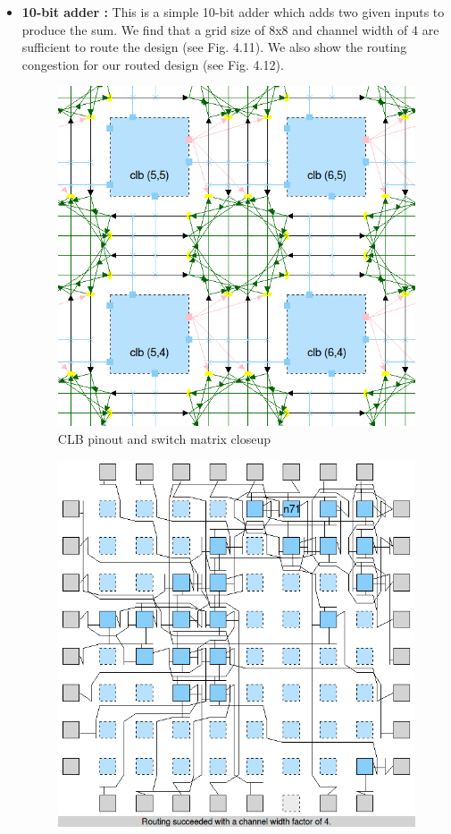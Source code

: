 \begin{itemize}

\item \textbf{10-bit adder :} This is a simple 10-bit adder which adds two given inputs to produce the sum. We find that a grid size of 8x8 and channel width of 4 are sufficient to route the design (see Fig. 4.11). We also show the routing congestion for our routed design (see Fig. 4.12).

\begin{figure}[H]
\centering
\includegraphics[scale=0.4]{BTP_work/8x8_closeup.png}
\caption{CLB pinout and switch matrix closeup}
\label{fig:Figure}
\end{figure}
\begin{figure}[H]
\centering
\includegraphics[scale=0.3]{BTP_work/8x8_adder_routing.png}

\end{figure}
\end{itemize}
